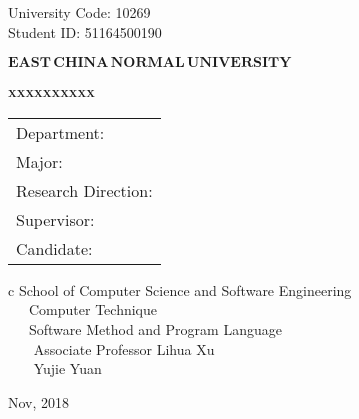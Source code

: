 \newpage

\pagestyle{empty}

\hskip 1.83cm {\large University Code: 10269}\\
\hspace*{\fill} {\large Student ID: 51164500190 }

\vskip 2cm

\begin{center}
{\Huge $\mathbf{EAST}\,\mathbf{CHINA}\,\mathbf{NORMAL}\,
\mathbf{UNIVERSITY}$}
\end{center}

\vskip 3cm

\begin{center}
\bfseries{\scshape{\huge xxxxxxxxxx}}\\
\end{center}

\vskip 2cm {\large
\begin{center}
\begin{tabular}{l}
Department:\\
Major:\\ 
Research Direction:\\
Supervisor:\\
Candidate:
\end{tabular}
\begin{tabular}c
\normalsize{School of Computer Science and Software Engineering}\\
\hline ~~~Computer Technique    \\
\hline ~~~Software Method and Program Language\\
\hline ~~~ Associate Professor Lihua Xu\\
\hline ~~~  Yujie  Yuan\\
\hline
\end{tabular}
\end{center}}

\vskip 30mm

\begin{center}
{\Large Nov, 2018}
\end{center}
